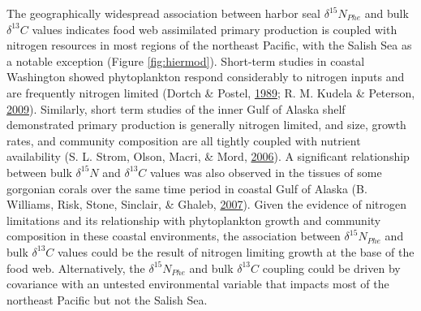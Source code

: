 \documentclass [11pt, proquest] {uwthesis}[2015/03/03]
\begin{document}
The geographically widespread association between harbor seal
\(\delta^{15}N_{Phe}\) and bulk \(\delta^{13}C\) values indicates food
web assimilated primary production is coupled with nitrogen resources in
most regions of the northeast Pacific, with the Salish Sea as a notable
exception (Figure \ref{fig:hiermod}). Short-term studies in coastal
Washington showed phytoplankton respond considerably to nitrogen inputs
and are frequently nitrogen limited (Dortch \& Postel,
\protect\hyperlink{ref-Dortch1989}{1989}; R. M. Kudela \& Peterson,
\protect\hyperlink{ref-Kudela2009}{2009}). Similarly, short term studies
of the inner Gulf of Alaska shelf demonstrated primary production is
generally nitrogen limited, and size, growth rates, and community
composition are all tightly coupled with nutrient availability (S. L.
Strom, Olson, Macri, \& Mord, \protect\hyperlink{ref-Strom2006}{2006}).
A significant relationship between bulk \(\delta^{15}N\) and
\(\delta^{13}C\) values was also observed in the tissues of some
gorgonian corals over the same time period in coastal Gulf of Alaska (B.
Williams, Risk, Stone, Sinclair, \& Ghaleb,
\protect\hyperlink{ref-Williams2007}{2007}). Given the evidence of
nitrogen limitations and its relationship with phytoplankton growth and
community composition in these coastal environments, the association
between \(\delta^{15}N_{Phe}\) and bulk \(\delta^{13}C\) values could be
the result of nitrogen limiting growth at the base of the food web.
Alternatively, the \(\delta^{15}N_{Phe}\) and bulk \(\delta^{13}C\)
coupling could be driven by covariance with an untested environmental
variable that impacts most of the northeast Pacific but not the Salish
Sea.
\end{document}
